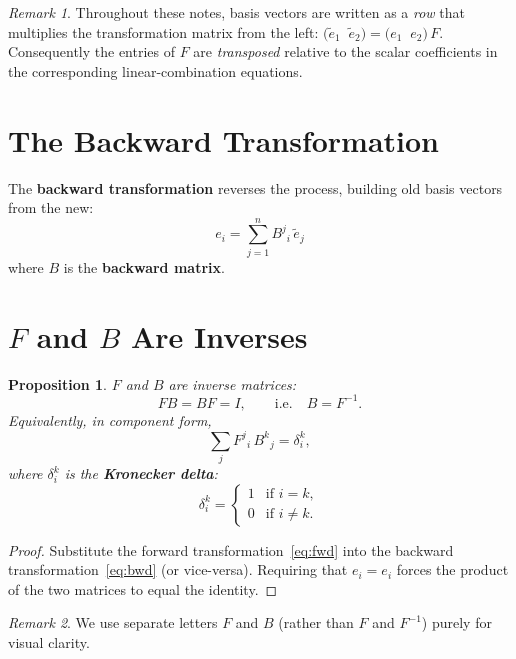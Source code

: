 \documentclass[12pt, a4paper]{report}
\theoremstyle{definition}
\theoremstyle{plain}
\newtheorem{proposition}{Proposition}[chapter]
\theoremstyle{remark}
\newtheorem{remark}{Remark}[chapter]
\newcommand{\tildee}[1]{\tilde{e}_{#1}}
\begin{document}
\begin{remark}
Throughout these notes, basis vectors are written as a \emph{row} that multiplies the
transformation matrix from the left:
$\bigl(\tildee{1}\;\; \tildee{2}\bigr)
= \bigl(e_1\;\; e_2\bigr)\,F.$
Consequently the entries of $F$ are \emph{transposed} relative to the scalar
coefficients in the corresponding linear-combination equations.
\end{remark}

\section{The Backward Transformation}

The \textbf{backward transformation} reverses the process, building old basis vectors
from the new:
\begin{equation}\label{eq:bwd}
    \boxed{e_i = \sum_{j=1}^{n} B^{j}{}_{i}\, \tildee{j}}
\end{equation}
where $B$ is the \textbf{backward matrix}.

\section{$F$ and $B$ Are Inverses}

\begin{proposition}
$F$ and $B$ are inverse matrices:
\[
    FB = BF = I, \qquad\text{i.e.}\quad B = F^{-1}.
\]
Equivalently, in component form,
\begin{equation}\label{eq:fb-inv}
    \sum_{j} F^{j}{}_{i}\, B^{k}{}_{j} = \delta^{k}_{i},
\end{equation}
where $\delta^{k}_{i}$ is the \textbf{Kronecker delta}:
\[
    \delta^{k}_{i} = \begin{cases} 1 & \text{if } i = k,\\ 0 & \text{if } i \neq k. \end{cases}
\]
\end{proposition}

\begin{proof}
Substitute the forward transformation~\eqref{eq:fwd} into the backward
transformation~\eqref{eq:bwd} (or vice-versa).  Requiring that $e_i = e_i$ forces
the product of the two matrices to equal the identity.
\end{proof}

\begin{remark}
We use separate letters $F$ and $B$ (rather than $F$ and $F^{-1}$) purely for visual
clarity.
\end{remark}
\end{document}
